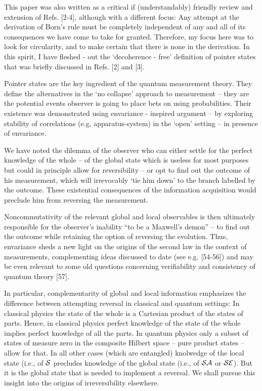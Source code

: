 \documentclass[aps,pra,epsfig,11pt,floatfix]{revtex4}
\begin{document}
This paper was also written as a critical if (understandably) friendly review 
and extension of Refs. [2-4], although with a different focus: Any attempt
at the derivation of Born's rule must be completely independent of any and 
all of its consequences we have come to take for granted. Therefore, 
my focus here was to look for circularity, and to make certain that there is none
in the derivation. In this spirit, I have fleshed - out the `decoherence - free' 
definition of pointer states that was briefly discussed in Refs. [2] and [3]. 

Pointer states are the key ingredient of the quantum measurement theory. 
They define the alternatives in the `no collapse' approach to measurement
-- they are the potential events observer is going to place bets on using 
probabilities. Their existence was demonstrated using envariance - inspired 
argument -- by exploring stability of correlations (e.g, apparatus-system) in 
the `open' setting -- in presence of envariance.

We have noted the dilemma of the observer who can either settle
for the perfect knowledge of the whole -- of the global state which is useless
for most purposes but could in principle allow for reversibility -- or opt to
find out the outcome of his measurement, which will irrevocably `tie him down'
to the branch labelled by the outcome. These existential consequences of the
information acquisition would preclude him from reversing the measurement.

Noncommutativity of the relevant global and local observables is then ultimately
responsible for the observer's inability ``to be a Maxwell's demon'' -- to find
out the outcome while retaining the option of reversing the evolution.
Thus, envariance sheds a new light on the origins of the second law in the
context of measurements, complementing ideas discussed to date (see e.g.
[54-56]) and may be even relevant to some old questions concerning
verifiability and consistency of quantum theory [57]. 

In particular, complementarity of global and local information emphasizes 
the difference between attempting reversal
in classical and quantum settings: In classical physics the state of the whole
is a Cartesian product of the states of parts. Hence, in classical physics
perfect knowledge of the state of the whole implies perfect knowledge of all
the parts. In quantum physics only a subset of states of measure zero in the
composite Hilbert space -- pure product states -- allow for that. In all other
cases (which are entangled) knolwedge of the local state (i.e., of ${\cal S}$
precludes knowledge of the global state (i.e., of ${\cal SA}$ or ${\cal SE}$).
But it is the global state that is needed to implement a reversal. We shall
pursue this insight into the origins of irreversibility elsewhere.
\end{document}
